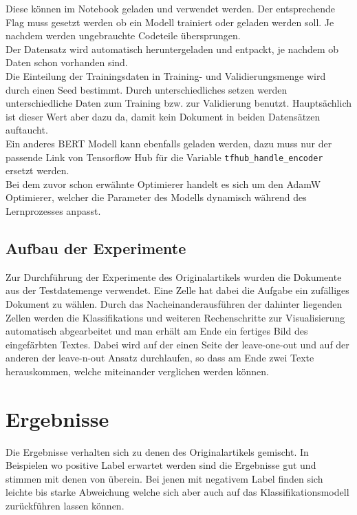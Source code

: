 \documentclass[DIV=13,fontsize=11pt]{scrartcl}
\begin{document}
Diese können im Notebook geladen und verwendet werden. Der entsprechende
Flag muss gesetzt werden ob ein Modell trainiert oder geladen werden soll.
Je nachdem werden ungebrauchte Codeteile übersprungen.\\

Der Datensatz wird automatisch heruntergeladen und entpackt, je nachdem ob
Daten schon vorhanden sind.\\

Die Einteilung der Trainingsdaten in Training- und Validierungsmenge wird durch
einen Seed bestimmt. Durch unterschiedliches setzen werden unterschiedliche
Daten zum Training bzw. zur Validierung benutzt. Hauptsächlich ist dieser
Wert aber dazu da, damit kein Dokument in beiden Datensätzen auftaucht.\\

Ein anderes BERT Modell kann ebenfalls geladen werden, dazu muss nur der passende
Link von Tensorflow Hub für die Variable \texttt{tfhub\_handle\_encoder} ersetzt
werden.\\

Bei dem zuvor schon erwähnte Optimierer handelt es sich um den AdamW~\cite{DBLP:journals/corr/abs-1711-05101}
Optimierer, welcher die Parameter des Modells dynamisch während des Lernprozesses
anpasst.\\

\subsection{Aufbau der Experimente}

Zur Durchführung der Experimente des Originalartikels wurden die Dokumente
aus der Testdatemenge verwendet. Eine Zelle hat dabei die Aufgabe ein zufälliges
Dokument zu wählen. Durch das Nacheinanderausführen der dahinter liegenden
Zellen werden die Klassifikations und weiteren Rechenschritte zur Visualisierung
automatisch abgearbeitet und man erhält am Ende ein fertiges Bild des
eingefärbten Textes. Dabei wird auf der einen Seite der leave-one-out und auf der
anderen der leave-n-out Ansatz durchlaufen, so dass am Ende zwei Texte herauskommen,
welche miteinander verglichen werden können.

\section{Ergebnisse}

Die Ergebnisse verhalten sich zu denen des Originalartikels gemischt. In Beispielen
wo positive Label erwartet werden sind die Ergebnisse gut und stimmen mit denen
von \citeauthor{dunn2021context} überein. Bei jenen mit negativem Label finden
sich leichte bis starke Abweichung welche sich aber auch auf das
Klassifikationsmodell zurückführen lassen können.\\
\end{document}
